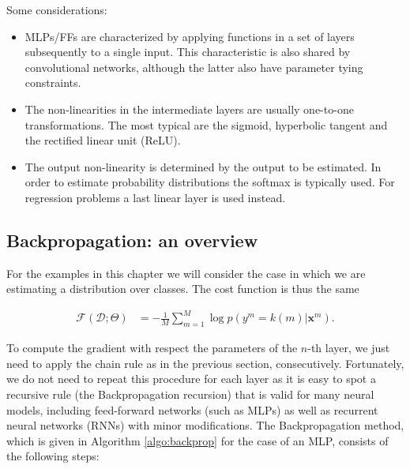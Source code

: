 \noindent Some considerations:
%
\begin{itemize}
\item MLPs/FFs are characterized by applying functions in a set of layers subsequently to a single input. This characteristic is also shared by convolutional networks, although the latter also have parameter tying constraints.
\item The non-linearities in the intermediate layers are usually one-to-one transformations. The most typical are the sigmoid, hyperbolic tangent and the rectified linear unit (ReLU). 
\item The output non-linearity is determined by the output to be estimated. In order to estimate probability distributions the softmax is typically used. For regression problems a last linear layer is used instead.
\end{itemize}

\subsection{Backpropagation: an overview}

For the examples in this chapter we will consider the case in which we are estimating a distribution over classes. The cost function is thus the same

\begin{align}
\mathcal{F}(\mathcal{D};\Theta) & = -\frac{1}{M}\sum_{m=1}^{M} \log p(y^m=k(m) | \mathbf{x}^m).
\end{align}

To compute the gradient with respect the parameters of the $n$-th layer, we
just need to apply the chain rule as in the previous section, consecutively.
Fortunately, we do not need to repeat this procedure for each layer as it is
easy to spot a recursive rule (the Backpropagation recursion) that is valid
for many neural models, including feed-forward networks (such as MLPs) as well
as recurrent neural networks (RNNs) with minor modifications. The
Backpropagation method, which is given in Algorithm \ref{algo:backprop} for
the case of an MLP, consists of the following steps:

